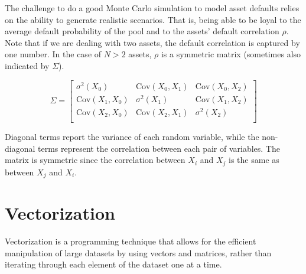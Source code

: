 %
%

The challenge to do a good Monte Carlo simulation to model asset defaults relies on the ability to generate realistic scenarios. That is, being able to be loyal to the average default probability of the pool and to the assets’ default correlation $\rho$. Note that if we are dealing with two assets, the default correlation is captured by one number. In the case of $N>2$ assets, $\rho$ is a symmetric matrix (sometimes also indicated by $\Sigma$).

\begin{equation*}
\Sigma = \begin{bmatrix}
\sigma^2 (X_0) & \mathrm{Cov}(X_0, X_1) & \mathrm{Cov}(X_0, X_2)\\
 \mathrm{Cov}(X_1, X_0) & \sigma^2 (X_1) & \mathrm{Cov}(X_1, X_2)\\
 \mathrm{Cov}(X_2, X_0) & \mathrm{Cov}(X_2, X_1) & \sigma^2 (X_2)\\
\end{bmatrix}
\end{equation*}
 
Diagonal terms report the variance of each random variable, while the non-diagonal terms represent the correlation between each pair of variables. The matrix is symmetric since the correlation between $X_i$ and $X_j$ is the same as between $X_j$ and $X_i$.

\section{Vectorization}
\label{seq:vectorization}
Vectorization is a programming technique that allows for the efficient manipulation of large datasets by using vectors and matrices, rather than iterating through each element of the dataset one at a time.

